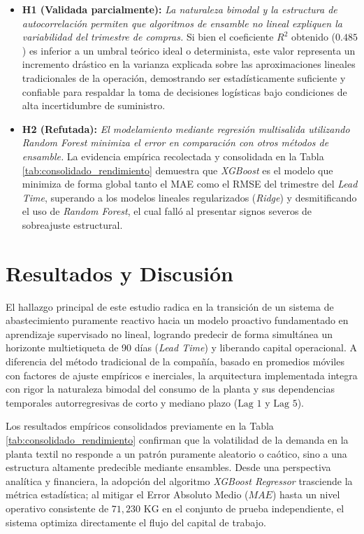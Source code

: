 \documentclass[conference,twoside]{IEEEtran}
\begin{document}
\begin{itemize}
    \item \textbf{H1 (Validada parcialmente):} \textit{La naturaleza bimodal y la estructura de autocorrelación permiten que algoritmos de ensamble no lineal expliquen la variabilidad del trimestre de compras.} Si bien el coeficiente $R^2$ obtenido ($0.485$) es inferior a un umbral teórico ideal o determinista, este valor representa un incremento drástico en la varianza explicada sobre las aproximaciones lineales tradicionales de la operación, demostrando ser estadísticamente suficiente y confiable para respaldar la toma de decisiones logísticas bajo condiciones de alta incertidumbre de suministro.
    \item \textbf{H2 (Refutada):} \textit{El modelamiento mediante regresión multisalida utilizando Random Forest minimiza el error en comparación con otros métodos de ensamble.} La evidencia empírica recolectada y consolidada en la Tabla \ref{tab:consolidado_rendimiento} demuestra que \textit{XGBoost} es el modelo que minimiza de forma global tanto el MAE como el RMSE del trimestre del \textit{Lead Time}, superando a los modelos lineales regularizados (\textit{Ridge}) y desmitificando el uso de \textit{Random Forest}, el cual falló al presentar signos severos de sobreajuste estructural.
\end{itemize}




\section{Resultados y Discusión}
\label{sec:resultados_discursion}

El hallazgo principal de este estudio radica en la transición de un sistema de abastecimiento puramente reactivo hacia un modelo proactivo fundamentado en aprendizaje supervisado no lineal, logrando predecir de forma simultánea un horizonte multietiqueta de 90 días (\textit{Lead Time}) y liberando capital operacional. A diferencia del método tradicional de la compañía, basado en promedios móviles con factores de ajuste empíricos e inerciales, la arquitectura implementada integra con rigor la naturaleza bimodal del consumo de la planta y sus dependencias temporales autorregresivas de corto y mediano plazo ($\text{Lag } 1$ y $\text{Lag } 5$).

Los resultados empíricos consolidados previamente en la Tabla \ref{tab:consolidado_rendimiento} confirman que la volatilidad de la demanda en la planta textil no responde a un patrón puramente aleatorio o caótico, sino a una estructura altamente predecible mediante ensambles. Desde una perspectiva analítica y financiera, la adopción del algoritmo \textit{XGBoost Regressor} trasciende la métrica estadística; al mitigar el Error Absoluto Medio ($MAE$) hasta un nivel operativo consistente de $71,230\text{ KG}$ en el conjunto de prueba independiente, el sistema optimiza directamente el flujo del capital de trabajo. 
\end{document}
